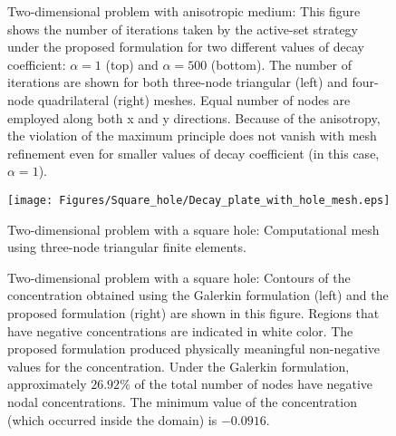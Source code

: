 \documentclass[11pt]{amsart}
\begin{document}
\begin{figure}[htbp]
  \centering
\caption{Two-dimensional problem with anisotropic medium: This figure shows the number of iterations 
    taken by the active-set strategy under the proposed formulation for two different values of decay 
    coefficient: $\alpha = 1$ (top) and $\alpha = 500$ (bottom). The number of iterations are shown for 
    both three-node triangular (left) and four-node quadrilateral (right) meshes. Equal number of nodes 
    are employed along both x and y directions. Because of the anisotropy, the violation of the maximum 
    principle does not vanish with mesh refinement even for smaller values of decay coefficient (in 
    this case, $\alpha = 1$).} \label{Fig:Decay_anisotropy_iterations_vs_XSeed_alpha_1}
\end{figure}

\clearpage
\newpage

\begin{figure}[!h]
  \centering
  \texttt{[image: Figures/Square\_hole/Decay\_plate\_with\_hole\_mesh.eps]}       
\caption{Two-dimensional problem with a square hole: Computational mesh using 
    three-node triangular finite elements.} \label{Fig:Decay_plate_with_hole_mesh}
\end{figure}

\begin{figure}[!h]
  \centering
\caption{Two-dimensional problem with a square hole: Contours of the concentration 
    obtained using the Galerkin formulation (left) and the proposed formulation 
    (right) are shown in this figure. Regions that have negative concentrations 
    are indicated in white color. The proposed formulation produced physically 
    meaningful non-negative values for the concentration. Under the Galerkin 
    formulation, approximately $26.92\%$ of the total number of nodes have 
    negative nodal concentrations. The minimum value of the concentration 
    (which occurred inside the domain) is $-0.0916$.} 
  \label{Fig:Decay_plate_with_hole_NR}
\end{figure}
\end{document}
